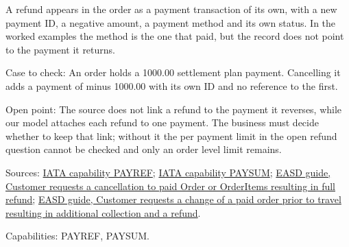 \begin{definition}
  \label{def:payment-refund-negative-payment}
  \notready
  A refund appears in the order as a payment transaction of its own, with a
  new payment ID, a negative amount, a payment method and its own status. In
  the worked examples the method is the one that paid, but the record does
  not point to the payment it returns.

  Case to check: An order holds a 1000.00 settlement plan payment.
  Cancelling it adds a payment of minus 1000.00 with its own ID and no
  reference to the first.

  Open point: The source does not link a refund to the payment it reverses,
  while our model attaches each refund to one payment. The business must
  decide whether to keep that link; without it the per payment limit in the
  open refund question cannot be checked and only an order level limit
  remains.

  Sources: \href{https://retailing.iata.org/armi/docs/PAYREF/}{IATA capability PAYREF};
  \href{https://retailing.iata.org/armi/docs/PAYSUM/}{IATA capability PAYSUM};
  \href{https://standards.atlassian.net/wiki/spaces/EASD/pages/817594417/Customer+requests+a+cancellation+to+paid+Order+or+OrderItems+resulting+in+full+refund}{EASD guide, Customer requests a cancellation to paid Order or OrderItems resulting in full refund};
  \href{https://standards.atlassian.net/wiki/spaces/EASD/pages/842301447/Customer+requests+a+change+of+a+paid+order+prior+to+travel+resulting+in+additional+collection+and+a+refund}{EASD guide, Customer requests a change of a paid order prior to travel resulting in additional collection and a refund}.

  Capabilities: PAYREF, PAYSUM.
\end{definition}

